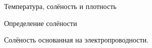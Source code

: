 \begin{chapter}{Температура, солёность и плотность}
\begin{section}{Определение солёности}
\begin{paragraph}{Солёность основанная на электропроводности.}
\end{paragraph}


\end{section}
\end{chapter}

